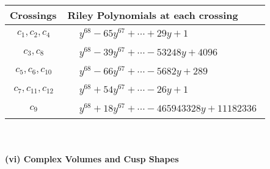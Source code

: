 \documentclass[1p]{elsarticle_modified}
\theoremstyle{definition}
\begin{document}
\begin{tabular}{m{50pt}|m{274pt}}
Crossings & \hspace{64pt}Riley Polynomials at each crossing \\
\hline $$\begin{aligned}c_{1},c_{2},c_{4}\end{aligned}$$&$\begin{aligned}
&y^{68}-65 y^{67}+\cdots+29 y+1
\end{aligned}$\\
\hline $$\begin{aligned}c_{3},c_{8}\end{aligned}$$&$\begin{aligned}
&y^{68}-39 y^{67}+\cdots-53248 y+4096
\end{aligned}$\\
\hline $$\begin{aligned}c_{5},c_{6},c_{10}\end{aligned}$$&$\begin{aligned}
&y^{68}-66 y^{67}+\cdots-5682 y+289
\end{aligned}$\\
\hline $$\begin{aligned}c_{7},c_{11},c_{12}\end{aligned}$$&$\begin{aligned}
&y^{68}+54 y^{67}+\cdots-26 y+1
\end{aligned}$\\
\hline $$\begin{aligned}c_{9}\end{aligned}$$&$\begin{aligned}
&y^{68}+18 y^{67}+\cdots-465943328 y+11182336
\end{aligned}$\\
\hline
\end{tabular}\\~\\
\newpage\flushleft \textbf{(vi) Complex Volumes and Cusp Shapes}
\end{document}
